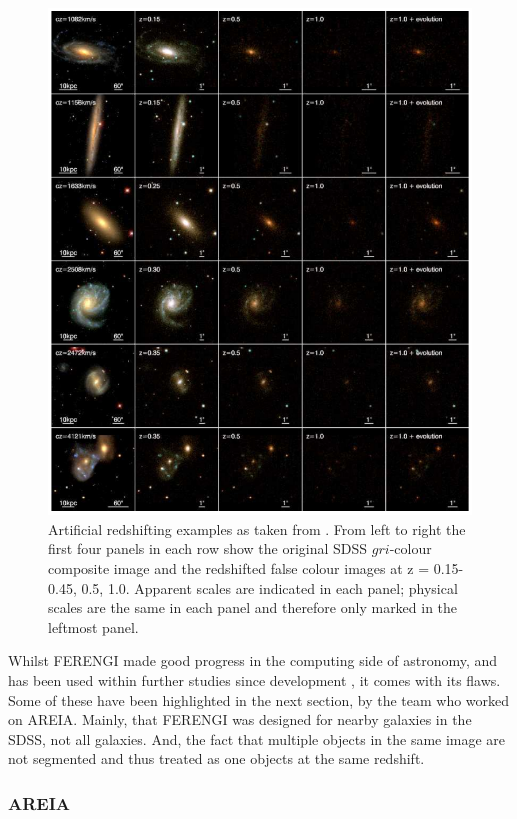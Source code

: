 \documentclass[fleqn,usenatbib]{mnras}
\begin{document}
\begin{figure}
	\includegraphics[width=\columnwidth]{Figures/Barden2008.PNG}
    \caption{Artificial redshifting examples as taken from \citet{Barden2008}. From left to right the first four panels in each row show the original SDSS $gri$-colour composite image and the redshifted false colour images at z = 0.15- 0.45, 0.5, 1.0. Apparent scales are indicated in each panel; physical scales are the same in each panel and therefore only marked in the leftmost panel.}
    \label{fig:FERENGI}
\end{figure}

Whilst FERENGI made good progress in the computing side of astronomy, and has been used within further studies since development \citep{Douglas2012}, it comes with its flaws. Some of these have been highlighted in the next section, by the team who worked on AREIA. Mainly, that FERENGI was designed for nearby galaxies in the SDSS, not all galaxies. And, the fact that multiple objects in the same image are not segmented and thus treated as one objects at the same redshift.


\subsubsection{AREIA}
\label{sec:AREIA}
\end{document}
